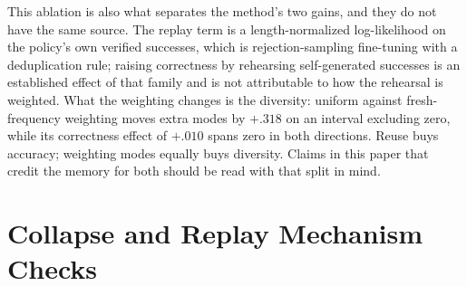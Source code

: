 \documentclass{article}
\newcommand{\1}{\mathbf 1}
\theoremstyle{remark}
\theoremstyle{definition}
\theoremstyle{plain}
\begin{document}
This ablation is also what separates the method's two gains, and they do not
have the same source. The replay term is a length-normalized log-likelihood on
the policy's own verified successes, which is rejection-sampling fine-tuning
\citep{dong2023raft} with a deduplication rule; raising correctness by
rehearsing self-generated successes is an established effect of that family and
is not attributable to how the rehearsal is weighted. What the weighting
changes is the diversity: uniform against fresh-frequency weighting moves extra
modes by $+.318$ on an interval excluding zero, while its correctness effect of
$+.010$ spans zero in both directions. Reuse buys accuracy; weighting modes
equally buys diversity. Claims in this paper that credit the memory for both
should be read with that split in mind.



\section{Collapse and Replay Mechanism Checks}
\label{app:ablations}


\end{document}
